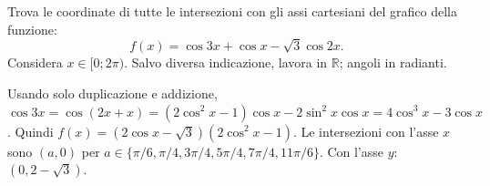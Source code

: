 
\begin{esercizio}
Trova le coordinate di tutte le intersezioni con gli assi
cartesiani del grafico della funzione: 
\[
f(x)=\cos 3x+\cos x-\sqrt{3}\cos 2x.
\]
Considera $x\in[0;2\pi)$.
Salvo diversa indicazione, lavora in $\mathbb R$; angoli in radianti.
\end{esercizio}

\begin{soluzione}
Usando solo duplicazione e addizione,
$\cos3x=\cos(2x+x)=(2\cos^2x-1)\cos x-2\sin^2x\cos x=4\cos^3x-3\cos x$.
Quindi $f(x)=(2\cos x-\sqrt3)(2\cos^2x-1)$.
Le intersezioni con l'asse $x$ sono $(a,0)$ per
$a\in\{\pi/6,\pi/4,3\pi/4,5\pi/4,7\pi/4,11\pi/6\}$.
Con l'asse $y$: $(0,2-\sqrt3)$.
\end{soluzione}
